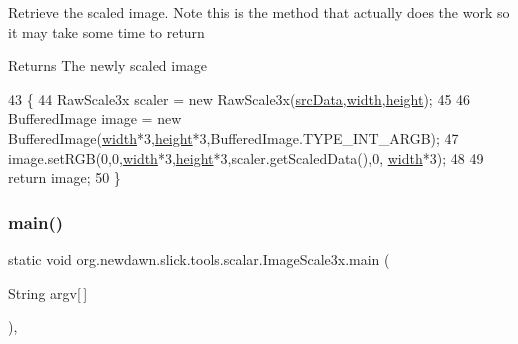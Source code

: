 Retrieve the scaled image. Note this is the method that actually does the work so it may take some time to return

\begin{DoxyReturn}{Returns}
The newly scaled image 
\end{DoxyReturn}

\begin{DoxyCode}
43     \{
44         RawScale3x scaler = \textcolor{keyword}{new} RawScale3x(\mbox{\hyperlink{classorg_1_1newdawn_1_1slick_1_1tools_1_1scalar_1_1_image_scale3x_ae5b333101bdebea500fe86161c247eba}{srcData}},\mbox{\hyperlink{classorg_1_1newdawn_1_1slick_1_1tools_1_1scalar_1_1_image_scale3x_a231fbd1dc91babe221fcce1c82d63155}{width}},\mbox{\hyperlink{classorg_1_1newdawn_1_1slick_1_1tools_1_1scalar_1_1_image_scale3x_ac2833ff5d8ce6679fed6cbe64efdb5d8}{height}});
45         
46         BufferedImage image = \textcolor{keyword}{new} BufferedImage(\mbox{\hyperlink{classorg_1_1newdawn_1_1slick_1_1tools_1_1scalar_1_1_image_scale3x_a231fbd1dc91babe221fcce1c82d63155}{width}}*3,\mbox{\hyperlink{classorg_1_1newdawn_1_1slick_1_1tools_1_1scalar_1_1_image_scale3x_ac2833ff5d8ce6679fed6cbe64efdb5d8}{height}}*3,BufferedImage.TYPE\_INT\_ARGB);
47         image.setRGB(0,0,\mbox{\hyperlink{classorg_1_1newdawn_1_1slick_1_1tools_1_1scalar_1_1_image_scale3x_a231fbd1dc91babe221fcce1c82d63155}{width}}*3,\mbox{\hyperlink{classorg_1_1newdawn_1_1slick_1_1tools_1_1scalar_1_1_image_scale3x_ac2833ff5d8ce6679fed6cbe64efdb5d8}{height}}*3,scaler.getScaledData(),0,
      \mbox{\hyperlink{classorg_1_1newdawn_1_1slick_1_1tools_1_1scalar_1_1_image_scale3x_a231fbd1dc91babe221fcce1c82d63155}{width}}*3);
48         
49         \textcolor{keywordflow}{return} image;
50     \}
\end{DoxyCode}
\mbox{\label{classorg_1_1newdawn_1_1slick_1_1tools_1_1scalar_1_1_image_scale3x_ac3c4f4de3ff2d753522089e404ea86ed}} 
\subsubsection{\texorpdfstring{main()}{main()}}
{\footnotesize\ttfamily static void org.\+newdawn.\+slick.\+tools.\+scalar.\+Image\+Scale3x.\+main (\begin{DoxyParamCaption}\item[{String}]{argv\mbox{[}$\,$\mbox{]} }\end{DoxyParamCaption})\hspace{0.3cm}{\ttfamily [inline]}, {\ttfamily [static]}}

